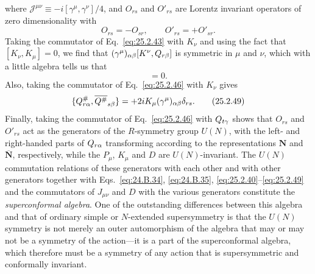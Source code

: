where \(\mathcal J^{\mu\nu}\equiv-i[\gamma^\mu,\gamma^\nu]/4\), and
\(O_{rs}\) and \(O'_{rs}\) are Lorentz invariant operators of zero
dimensionality with
\begin{equation}
O_{rs}=-O_{sr},
\qquad
O'_{rs}=+O'_{sr}.
\tag{25.2.47}\label{eq:25.2.47}
\end{equation}
Taking the commutator of Eq.~\eqref{eq:25.2.43} with \(K_\nu\) and using
the fact that \([K_\nu,K_\mu]=0\), we find that
\((\gamma^\mu)_{\alpha\beta}[K^\nu,Q_{r\beta}]\) is symmetric in
\(\mu\) and \(\nu\), which with a little algebra tells us that
\begin{equation}
[K^\nu,\MajoranaQ_{r\beta}]=0.
\tag{25.2.48}\label{eq:25.2.48}
\end{equation}
Also, taking the commutator of Eq.~\eqref{eq:25.2.46} with \(K_\nu\)
gives
\begin{equation}
\{Q^\#_{r\alpha},
\overline{Q^\#}_{s\beta}\}
=+2iK_\mu(\gamma^\mu)_{\alpha\beta}\delta_{rs}.
\tag{25.2.49}\label{eq:25.2.49}
\end{equation}
Finally, taking the commutator of Eq.~\eqref{eq:25.2.46} with
\(Q_{t\gamma}\) shows that \(O_{rs}\) and \(O'_{rs}\) act as the
generators of the \(R\)-symmetry group \(U(N)\), with the left- and
right-handed parts of \(Q_{r\alpha}\) transforming according to
the representations \(\mathbf N\) and \(\overline{\mathbf N}\),
respectively, while the \(P_\mu\), \(K_\mu\) and \(D\) are
\(U(N)\)-invariant. The \(U(N)\) commutation relations of these generators
with each other and with other generators together with
Eqs.~\eqref{eq:24.B.34}, \eqref{eq:24.B.35},
\eqref{eq:25.2.40}--\eqref{eq:25.2.49} and the commutators of
\(J_{\mu\nu}\) and \(D\) with the various generators constitute the
\emph{superconformal algebra}. One of the outstanding differences between
this algebra and that of ordinary simple or \(N\)-extended supersymmetry is
that the \(U(N)\) symmetry is not merely an outer automorphism of the
algebra that may or may not be a symmetry of the action---it is a part of
the superconformal algebra, which therefore must be a symmetry of any
action that is supersymmetric and conformally invariant.
